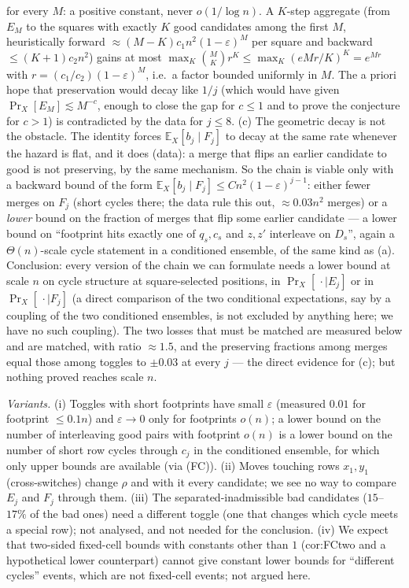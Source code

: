 for every $M$: a positive constant, never $o(1/\log n)$.  A $K$-step
aggregate (from $E_M$ to the squares with exactly $K$ good candidates
among the first $M$, heuristically forward
$\approx(M-K)c_1n^2(1-\varepsilon)^{M}$ per square and backward
$\le(K+1)c_2n^2$) gains at most
$\max_K\binom MK r^K\le\max_K(eMr/K)^K=e^{Mr}$ with
$r=(c_1/c_2)(1-\varepsilon)^M$, i.e.\ a factor bounded uniformly in
$M$.  The a priori hope that preservation would decay like $1/j$
(which would have given $\Pr_X[E_M]\lesssim M^{-c}$, enough to close
the gap for $c\le1$ and to prove the conjecture for $c>1$) is
contradicted by the data for $j\le8$.
(c) The geometric decay is not the obstacle.  The identity forces
$\mathbb E_X[b_j\mid F_j]$ to decay at the same rate whenever the
hazard is flat, and it does (data): a merge that flips an earlier
candidate to good is not preserving, by the same mechanism.  So the
chain is viable only with a backward bound of the form $\mathbb
E_X[b_j\mid F_j]\le C n^2(1-\varepsilon)^{j-1}$: either fewer merges
on $F_j$ (short cycles there; the data rule this out, $\approx0.03n^2$
merges) or a \emph{lower} bound on the fraction of merges that flip
some earlier candidate --- a lower bound on ``footprint hits exactly
one of $q_s,c_s$ and $z,z'$ interleave on $D_s$'', again a
$\Theta(n)$-scale cycle statement in a conditioned ensemble, of the
same kind as (a).  Conclusion: every version of the chain we can
formulate needs a lower bound at scale $n$ on cycle structure at
square-selected positions, in $\Pr_X[\,\cdot\mid E_j]$ or in
$\Pr_X[\,\cdot\mid F_j]$ (a direct comparison of the two conditional
expectations, say by a coupling of the two conditioned ensembles, is
not excluded by anything here; we have no such coupling).  The two
losses that must be matched are measured below and are matched, with
ratio $\approx1.5$, and the preserving fractions among merges equal
those among toggles to $\pm0.03$ at every $j$ --- the direct evidence
for (c); but nothing proved reaches scale $n$.

\emph{Variants.}  (i) Toggles with short footprints have small
$\varepsilon$ (measured $0.01$ for footprint $\le0.1n$) and
$\varepsilon\to0$ only for footprints $o(n)$; a lower bound on the
number of interleaving good pairs with footprint $o(n)$ is a lower
bound on the number of short row cycles through $c_j$ in the
conditioned ensemble, for which only upper bounds are available (via
(FC)).  (ii) Moves touching rows $x_1,y_1$ (cross-switches) change
$\rho$ and with it every candidate; we see no way to compare $E_j$
and $F_j$ through them.  (iii) The separated-inadmissible bad
candidates ($15$--$17\%$ of the bad ones) need a different toggle (one
that changes which cycle meets a special row); not analysed, and not
needed for the conclusion.  (iv) We expect that two-sided fixed-cell
bounds with constants other than $1$ (cor:FCtwo and a hypothetical
lower counterpart) cannot give constant lower bounds for
``different cycles'' events, which are not fixed-cell events; not
argued here.

